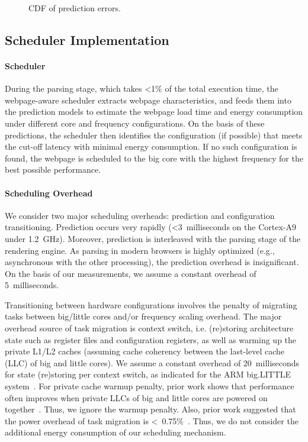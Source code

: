 \begin{figure}[t]
\hspace*{15pt}
\caption{CDF of prediction errors.}
\label{fig:model_eval}
\end{figure}

\subsection{Scheduler Implementation}
\label{sec:runtime:load:sched}

\paragraph{Scheduler} During the parsing stage, which takes \textless 1\% of the total execution time, the webpage-aware scheduler extracts webpage characteristics, and feeds them into the prediction models to estimate the webpage load time and energy consumption under different core and frequency configurations.  On the basis of these predictions, the scheduler then identifies the configuration (if possible) that meets the cut-off latency with minimal energy consumption. If no such configuration is found, the webpage is scheduled to the big core with the highest frequency for the best possible performance.

\paragraph{Scheduling Overhead} We consider two major scheduling overheads: prediction and configuration transitioning. Prediction occurs very rapidly (\textless 3~milliseconds on the Cortex-A9 under 1.2~GHz). Moreover, prediction is interleaved with the parsing stage of the rendering engine. As parsing in modern browsers is highly optimized (e.g., asynchronous with the other processing), the prediction overhead is insignificant. On the basis of our measurements, we assume a constant overhead of 5~milliseconds.

Transitioning between hardware configurations involves the penalty of migrating tasks between big/little cores and/or frequency scaling overhead. The major overhead source of task migration is context switch, i.e. (re)storing architecture state such as register files and configuration registers, as well as warming up the private L1/L2 caches (assuming cache coherency between the last-level cache (LLC) of big and little cores). We assume a constant overhead of 20~milliseconds for state (re)storing per context switch, as indicated for the ARM big.LITTLE system~\cite{big.little}. For private cache warmup penalty, prior work shows that performance often improves when private LLCs of big and little cores are powered on together~\cite{PIE}. Thus, we ignore the warmup penalty. Also, prior work suggested that the power overhead of task migration is <~0.75\%~\cite{tm}. Thus, we do not consider the additional energy consumption of our scheduling mechanism.

